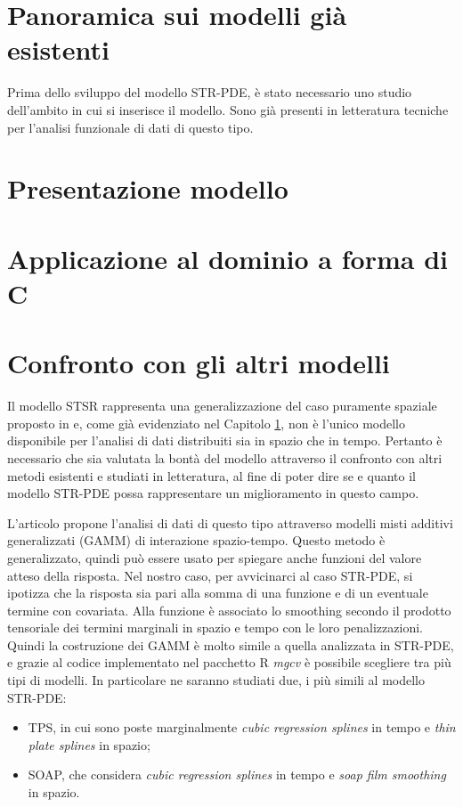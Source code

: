 \documentclass[a4paper,11pt,twoside,openright]{book}							%
\begin{document}
\chapter{Panoramica sui modelli già esistenti}
\label{cap:panoramica}
Prima dello sviluppo del modello STR-PDE, è stato necessario uno studio dell'ambito in cui si inserisce il modello. Sono già presenti in letteratura tecniche per l'analisi funzionale di dati di questo tipo.

\chapter{Presentazione modello}
\label{cap:modello}

\chapter{Applicazione al dominio a forma di C}
\label{cap:domC}

\chapter{Confronto con gli altri modelli}
\label{cap:confronto}

Il modello STSR rappresenta una generalizzazione del caso puramente spaziale proposto in \cite{art:sangalli} e, come già evidenziato nel Capitolo \ref{cap:panoramica}, non è l'unico modello disponibile per l'analisi di dati distribuiti sia in spazio che in tempo. Pertanto è necessario che sia valutata la bontà del modello attraverso il confronto con altri metodi esistenti e studiati in letteratura, al fine di poter dire se e quanto il modello STR-PDE possa rappresentare un miglioramento in questo campo.

L'articolo \cite{art:augustin} propone l'analisi di dati di questo tipo attraverso modelli misti additivi generalizzati (GAMM) di interazione spazio-tempo. Questo metodo è generalizzato, quindi può essere usato per spiegare anche funzioni del valore atteso della risposta. Nel nostro caso, per avvicinarci al caso STR-PDE, si ipotizza che la risposta sia pari alla somma di una funzione e di un eventuale termine con covariata. Alla funzione è associato lo smoothing secondo il prodotto tensoriale dei termini marginali in spazio e tempo con le loro penalizzazioni. Quindi la costruzione dei GAMM è molto simile a quella analizzata in STR-PDE, e grazie al codice implementato nel pacchetto R \textit{mgcv} è possibile scegliere tra più tipi di modelli. In particolare ne saranno studiati due, i più simili al modello STR-PDE:
\begin{itemize}
\item TPS, in cui sono poste marginalmente \textit{cubic regression splines} in tempo e \textit{thin plate splines} in spazio;
\item SOAP, che considera \textit{cubic regression splines} in tempo e \textit{soap film smoothing} in spazio.
\end{itemize}
\end{document}
